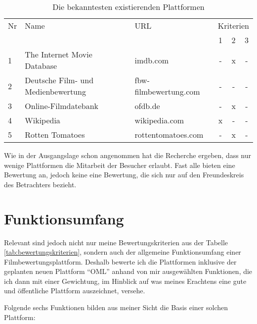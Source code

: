 \begin{table}[h]
\begin{center}
    \begin{tabular}{lllccc}
        \toprule Nr & Name & URL & \multicolumn{3}{c}{Kriterien} \\ & & & 1 & 2 & 3 \\
        \midrule 1 & The Internet Movie Database & imdb.com & - & x & - \\
        \midrule 2 & Deutsche Film- und Medienbewertung & fbw-filmbewertung.com & - & - & - \\
        \midrule 3 & Online-Filmdatebank & ofdb.de & - & x & - \\
        \midrule 4 & Wikipedia & wikipedia.com & x & - & - \\
        \midrule 5 & Rotten Tomatoes & rottentomatoes.com & - & x & - \\
        \bottomrule
    \end{tabular}
    \caption{Die bekanntesten existierenden Plattformen}
    \label{tab:plattformen}
\end{center}
\end{table}

Wie in der Ausgangslage schon angenommen hat die Recherche ergeben, dass nur
wenige Plattformen die Mitarbeit der Besucher erlaubt. Fast alle bieten
eine Bewertung an, jedoch keine eine Bewertung, die sich nur auf den
Freundeskreis des Betrachters bezieht.

\section{Funktionsumfang}
Relevant sind jedoch nicht nur meine Bewertungskriterien aus der Tabelle \ref{tab:bewertungskriterien},
sondern auch der allgemeine Funktionsumfang einer Filmbewertungsplattform.
Deshalb bewerte ich die Plattformen inklusive der geplanten neuen Plattform ``OML'' 
anhand von mir ausgewählten Funktionen, die ich dann mit einer Gewichtung,
im Hinblick auf was meines Erachtens eine gute und öffentliche Plattform auszeichnet, versehe.

Folgende sechs Funktionen bilden aus meiner Sicht die Basis einer solchen Plattform: 

